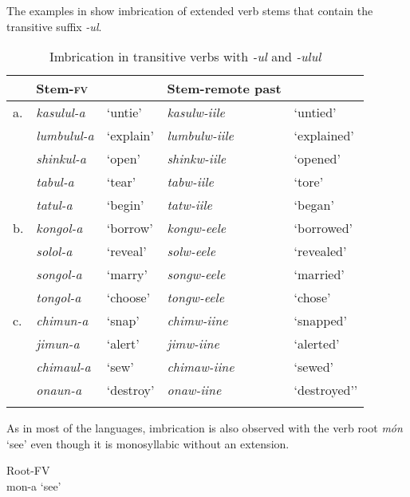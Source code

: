 \documentclass[output=paper]{langsci/langscibook}
\begin{document}
\z

The examples in  show imbrication of extended verb stems that contain the transitive suffix \textit{-ul}.


\begin{table}
\begin{tabularx}{\textwidth}{llXlX}
\lsptoprule
 & Stem-\textsc{fv} &  & Stem-remote past & \\
\midrule
a. & \textit{kasulul-a} & `untie' & \textit{kasulw-iile} & `untied' \\
 & \textit{lumbulul-a} & `explain' & \textit{lumbulw-iile} & `explained' \\
 & \textit{shinkul-a} & `open' & \textit{shinkw-iile} & `opened' \\
 & \textit{tabul-a} & `tear' & \textit{tabw-iile} & `tore' \\
 & \textit{tatul-a} & `begin' & \textit{tatw-iile} & `began' \\
\tablevspace
b. & \textit{kongol-a} & `borrow' & \textit{kongw-eele} & `borrowed' \\
 & \textit{solol-a} & `reveal' & \textit{solw-eele} & `revealed' \\
 & \textit{songol-a} & `marry' & \textit{songw-eele} & `married' \\
 & \textit{tongol-a} & `choose' & \textit{tongw-eele} & `chose' \\
\tablevspace
c. & \textit{chimun-a} & `snap' & \textit{chimw-iine} & `snapped' \\
 & \textit{jimun-a} & `alert' & \textit{jimw-iine} & `alerted' \\
 & \textit{chimaul-a} & `sew' & \textit{chimaw-iine} & `sewed' \\
 & \textit{onaun-a} & `destroy' & \textit{onaw-iine} & `destroyed’' \\

\lspbottomrule
\end{tabularx}

\caption{Imbrication in transitive verbs with \textit{-ul} and \textit{-ulul}}
\label{tab:23.kawasha}

\end{table}


As in most of the  languages, imbrication is also observed with the verb root \textit{món} ‘see’ even though it is monosyllabic without an extension. 

\ea\label{ex:8.kawasha}
   \ea\label{ex:8a.kawasha} Root-FV \\
   mon-a ‘see’
   
\end{document}
